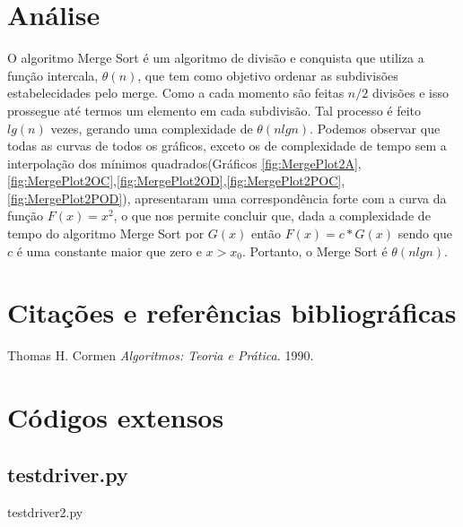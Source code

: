 \documentclass[12pt,a4paper,twoside]{report}
\begin{document}
\chapter{Análise}

O algoritmo Merge Sort é um algoritmo de divisão e conquista que utiliza a função intercala, $\theta(n)$, que tem como objetivo ordenar as subdivisões estabelecidades pelo merge. Como a cada momento são feitas $n/2$ divisões e isso prossegue até termos um elemento em cada subdivisão. Tal processo é feito $lg (n)$ vezes, gerando uma complexidade de $\theta(nlgn)$.
Podemos observar que todas as curvas de todos os gráficos, exceto os de complexidade de tempo sem a interpolação dos mínimos quadrados(Gráficos \ref{fig:MergePlot2A},\ref{fig:MergePlot2OC},\ref{fig:MergePlot2OD},\ref{fig:MergePlot2POC},\ref{fig:MergePlot2POD}), apresentaram uma correspondência forte com a curva da função $F(x) = x^2$, o que nos permite concluir que, dada a complexidade de tempo do algoritmo Merge Sort por $G(x)$ então $F(x) = c * G(x)$ sendo que $c$ é uma constante maior que zero e $x > x_0$. Portanto, o Merge Sort é $\theta(nlgn)$.

\chapter{Citações e referências bibliográficas}
	\begin{thebibliography}{1}
		
		 Thomas H. Cormen {\em 
			Algoritmos: Teoria e Prática.
		}  1990.
		
	\end{thebibliography}







\clearpage
{}
\appendix

\chapter{Códigos extensos \label{ap:testdriver}}
\section{testdriver.py}
 {testdriver2.py}
\end{document}
